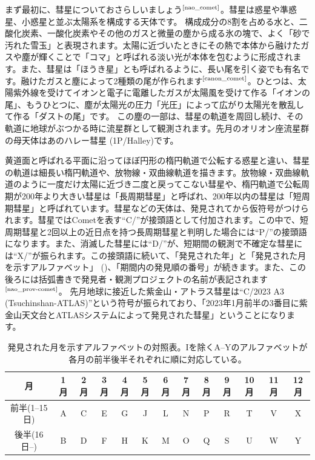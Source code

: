 \documentclass{supernova_pre}
\begin{document}
まず最初に、彗星についておさらしいましょう$^\text{\cite{nao_comet}}$。彗星は惑星や準惑星、小惑星と並ぶ太陽系を構成する天体です。
構成成分の8割を占める水と、二酸化炭素、一酸化炭素やその他のガスと微量の塵から成る氷の塊で、よく「砂で汚れた雪玉」と表現されます。太陽に近づいたときにその熱で本体から融けたガスや塵が輝くことで「コマ」と呼ばれる淡い光が本体を包むように形成されます。また、彗星は「ほうき星」とも呼ばれるように、長い尾を引く姿でも有名です。融けたガスと塵によって2種類の尾が作られます$^\text{\cite{canon_comet}}$。ひとつは、太陽紫外線を受けてイオンと電子に電離したガスが太陽風を受けて作る「イオンの尾」、もうひとつに、塵が太陽光の圧力「光圧」によって広がり太陽光を散乱して作る「ダストの尾」です。
この塵の一部は、彗星の軌道を周回し続け、その軌道に地球がぶつかる時に流星群として観測されます。先月のオリオン座流星群の母天体はあのハレー彗星 (1P/Halley)です。

黄道面と呼ばれる平面に沿ってほぼ円形の楕円軌道で公転する惑星と違い、彗星の軌道は細長い楕円軌道や、放物線・双曲線軌道を描きます。放物線・双曲線軌道のように一度だけ太陽に近づき二度と戻ってこない彗星や、楕円軌道で公転周期が200年より大きい彗星は「長周期彗星」と呼ばれ、200年以内の彗星は「短周期彗星」と呼ばれています。彗星などの天体は、発見されてから仮符号がつけられます。彗星ではCometを表す``C/''が接頭語として付加されます。この中で、短周期彗星と2回以上の近日点を持つ長周期彗星と判明した場合には``P/''の接頭語になります。また、消滅した彗星には``D/''が、短期間の観測で不確定な彗星には``X/''が振られます。この接頭語に続いて、「発見された年」と「発見された月を示すアルファベット」 ()、「期間内の発見順の番号」が続きます。また、この後ろには括弧書きで発見者・観測プロジェクトの名前が表記されます$^\text{\cite{nao_prov-comet}}$。
先月地球に接近した紫金山・アトラス彗星は``C/2023 A3 (Tsuchinshan-ATLAS)''という符号が振られており、「2023年1月前半の3番目に紫金山天文台とATLASシステムによって発見された彗星」ということになります。

\begin{table}
    \centering
    \caption{発見された月を示すアルファベットの対照表。Iを除くA--Yのアルファベットが各月の前半後半それぞれに順に対応している。}
    \label{tab:alphabet}
    \begin{tabular}{c|cccccccccccc}\hline
        月 & 1月 & 2月 & 3月 & 4月 & 5月 & 6月 & 7月 & 8月 & 9月 & 10月 & 11月 & 12月 \\
        \hline
        前半(1--15日) & A & C & E & G & J & L & N & P & R & T & V & X \\
        後半(16日--) & B & D & F & H & K & M & O & Q & S & U & W & Y \\
        \hline
    \end{tabular}
\end{table}
\end{document}

